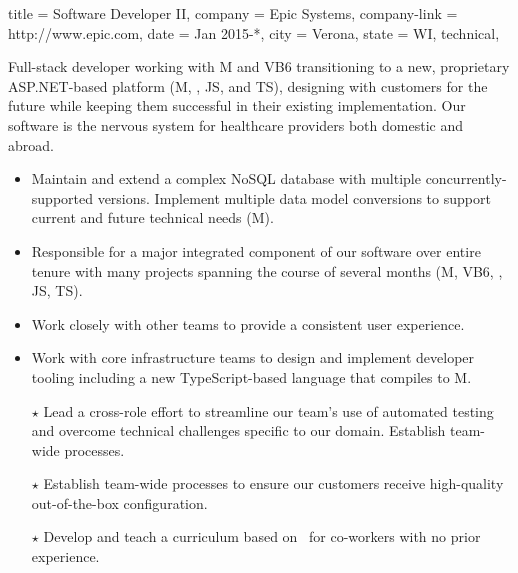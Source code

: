 \begin{position}
  {
    title   = Software Developer II,
    company = Epic Systems,
    company-link = http://www.epic.com,
    date    = Jan 2015-*,
    city    = Verona,
    state   = WI,
    technical,
  }

  Full-stack developer working with M and VB6 transitioning to a new,
  proprietary ASP.NET-based platform (M, \CSharp, JS, and TS),
  designing with customers for the future while keeping them
  successful in their existing implementation.  Our software is the
  nervous system for healthcare providers both domestic and abroad.

  \medskip

\begin{itemize}
  \def\importantpoint{{\large$\star$\hspace*{-1pt}}}
\item Maintain and extend a complex NoSQL database with multiple
  concurrently-supported versions.  Implement multiple data model
  conversions to support current and future technical needs (M).
\item Responsible for a major integrated component of our software
  over entire tenure \Dash with many projects spanning the course of
  several months (M, VB6, \CSharp, JS, TS).
\item Work closely with other teams to provide a consistent user
  experience.
\item Work with core infrastructure teams to design and implement
  developer tooling \Dash including a new TypeScript-based language
  that compiles to M.
\item[\importantpoint] Lead a cross-role effort to
  streamline our team's use of automated testing and overcome
  technical challenges specific to our domain. Establish team-wide
  processes.
\item[\importantpoint] Establish team-wide processes to
  ensure our customers receive high-quality out-of-the-box
  configuration.
\item[\importantpoint] Develop and teach a curriculum
  based on \CSharp\ for co-workers with no prior %
  experience.
\end{itemize}
\end{position}

